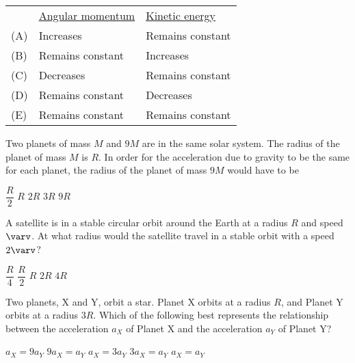 \documentclass{../../oss-classkick-exam}
\begin{document}
\begin{multicols*}{2}
\begin{questions}
    \begin{tabular}{lll}
      & \underline{Angular momentum} & \underline{Kinetic energy}\\
      (A) & Increases & Remains constant \\
      (B) & Remains constant & Increases \\
      (C) & Decreases & Remains constant \\
      (D) & Remains constant & Decreases \\
      (E) & Remains constant & Remains constant
    \end{tabular}
    \vspace{.7in}
    
    \question Two planets of mass $M$ and $9M$ are in the same solar system. The
    radius of the planet of mass $M$ is $R$. In order for the acceleration due
    to gravity to be the same for each planet, the radius of the planet of mass
    $9M$ would have to be
    \begin{choices}
      \choice $\dfrac R2$
      \choice $R$
      \choice $2R$
      \choice $3R$
      \choice $9R$
    \end{choices}
    
    \question A satellite is in a stable circular orbit around the Earth at a
    radius $R$ and speed $\varv$. At what radius would the satellite travel in
    a stable orbit with a speed $2\varv$?
    \begin{choices}
      \choice $\dfrac R4$
      \choice $\dfrac R2$
      \choice $R$
      \choice $2R$
      \choice $4R$
    \end{choices}

    \question Two planets, X and Y, orbit a star. Planet X orbits at a radius
    $R$, and Planet Y orbits at a radius $3R$. Which of the following best
    represents the relationship between the acceleration $a_X$ of Planet X and
    the acceleration $a_Y$ of Planet Y?
    \begin{center}
    \end{center}
    \begin{choices}
      \choice $a_X = 9a_Y$
      \choice $9a_X = a_Y$
      \choice $a_X = 3a_Y$
      \choice $3a_X = a_Y$
      \choice $a_X = a_Y$
    \end{choices}


\end{questions}
\end{multicols*}
\end{document}
